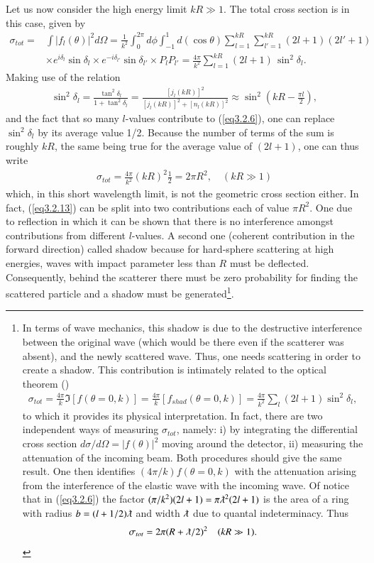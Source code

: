 Let us now consider the high energy limit $kR\gg 1$. The total cross section is in this case, given by
\begin{align}\label{eq3.2.6}
\nonumber\sigma_{tot}=&\int |f_l(\theta)|^2d\Omega=\frac{1}{k^2}\int_0^{2\pi}d\phi\int_{-1}^{1}d(\cos\theta)\sum_{l=1}^{kR}\sum_{l'=1}^{kR}(2l+1)(2l'+1)\\
&\times e^{i\delta_l}\sin\delta_l\times  e^{-i\delta_{l'}}\sin\delta_{l'}\times P_lP_{l'}=\frac{4\pi}{k^2}\sum_{l=1}^{kR}(2l+1)\,\sin^2\delta_l.
\end{align}
Making use of the relation
\begin{align}\label{eq3.2.7}
\sin^2\delta_l=\frac{\tan^2\delta_l}{1+\tan^2\delta_l}=\frac{[j_l(kR)]^2}{[j_l(kR)]^2+[n_l(kR)]^2}\approx\sin^2\left(kR-\frac{\pi l}{2}\right),
\end{align}
and the fact that so many $l$-values contribute to (\ref{eq3.2.6}), one can replace $\sin^2\delta_l$ by its average value 1/2. Because the number of terms of the sum is roughly $kR$, the same being true for the average value of $(2l+1)$, one can thus write
\begin{align}\label{eq3.2.13}
\sigma_{tot}=\frac{4\pi}{k^2}(kR)^2\frac{1}{2}=2\pi R^2,\quad (kR\gg1)
\end{align}
which, in this short wavelength limit, is not the geometric cross section either. In fact, (\ref{eq3.2.13}) can be split into two contributions each of value $\pi R^2$. One due to reflection in which it can be shown that there is no interference amongst contributions from different $l$-values. A second one (coherent contribution in the forward direction) called shadow because for hard-sphere scattering at high energies, waves with impact parameter less than $R$ must be deflected. Consequently, behind the scatterer there must be zero probability for finding the scattered particle and a shadow must be generated\footnote{In terms of wave mechanics, this shadow is due to the destructive interference between the original wave (which would be there even if the scatterer was absent), and the newly scattered wave. Thus, one needs scattering in order to create a shadow. This contribution is intimately related to the optical theorem (\cite{Sakurai:94})
\begin{align*}
\sigma_{tot}=\frac{4\pi}{k}\Im[f(\theta=0,k)]=\frac{4\pi}{k}[f_{shad}(\theta=0,k)]=\frac{4\pi}{k^2}\sum_l(2l+1)\sin^2\delta_l,
\end{align*}
to which it provides its physical interpretation. In fact,  there are two independent ways of measuring $\sigma_{tot}$, namely: i) by integrating the differential cross section $d\sigma/d\Omega=|f(\theta)|^2$ moving around the detector, ii) measuring the attenuation of the incoming beam. Both procedures should give the same result. One then identifies $(4\pi/k)f(\theta=0,k)$ with the attenuation arising from the interference of the elastic wave with the incoming wave. Of notice that in (\ref{eq3.2.6}) the factor $(\pi/k^2)(2l+1)=\pi\lambdabar^2(2l+1)$ is the area of a ring  with radius $b=(l+1/2)\lambdabar$ and width $\lambdabar$ due to quantal indeterminacy. Thus
\begin{align*}
\sigma_{tot}=2\pi(R+\lambdabar/2)^2\quad(kR\gg1).
\end{align*}}.
